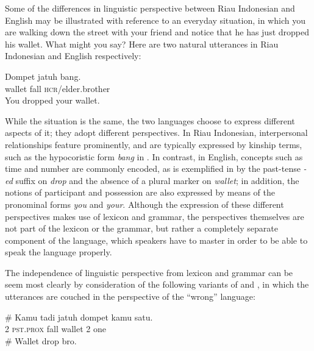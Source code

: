 \documentclass[output=paper]{langscibook}
\begin{document}
Some of the differences in linguistic perspective between Riau Indonesian and English may be illustrated with reference to an everyday situation, in which you are walking down the street with your friend and notice that he has just dropped his wallet.  What might you say?  Here are two natural utterances in Riau Indonesian and English respectively:

\ea \label{ex:gil:5}
\gll Dompet	jatuh	bang. \\
    wallet	fall	\textsc{hcr}/elder.brother \\
\ex \label{ex:gil:6}
You dropped your wallet. \\
\z

While the situation is the same, the two languages choose to express different aspects of it; they adopt different perspectives. In Riau Indonesian, interpersonal relationships feature prominently, and are typically expressed by kinship terms, such as the hypocoristic form \textit{bang} in .  In contrast, in English, concepts such as time and number are commonly encoded, as is exemplified in  by the past-tense \textit{-ed} suffix on \textit{drop} and the absence of a plural marker on \textit{wallet}; in addition, the notions of participant and possession are also expressed by means of the pronominal forms \textit{you} and \textit{your}. Although the expression of these different perspectives makes use of lexicon and grammar, the perspectives themselves are not part of the lexicon or the grammar, but rather a completely separate component of the language, which speakers have to master in order to be able to speak the language properly.  

The independence of linguistic perspective from lexicon and grammar can be seem most clearly by consideration of the following variants of  and , in which the utterances are couched in the perspective of the ``wrong'' language:

\ea \label{ex:gil:7}
\gll \# Kamu	tadi	jatuh	dompet	kamu	satu. \\
    { } 2	\textsc{pst.prox}	fall	wallet	2	one \\
\ex \label{ex:gil:8}
\# Wallet drop bro. \\
\z
\end{document}
